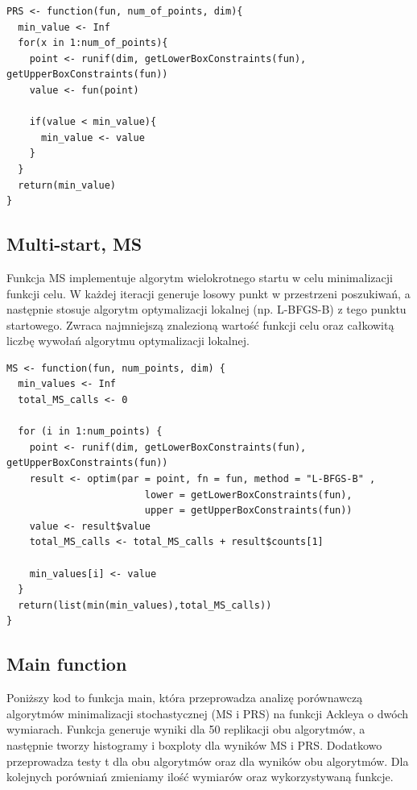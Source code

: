 \documentclass{article}
\begin{document}
\begin{verbatim}
PRS <- function(fun, num_of_points, dim){
  min_value <- Inf
  for(x in 1:num_of_points){
    point <- runif(dim, getLowerBoxConstraints(fun), getUpperBoxConstraints(fun))
    value <- fun(point)

    if(value < min_value){
      min_value <- value
    }
  }
  return(min_value)
}
\end{verbatim}




\subsection{Multi-start, MS}

\hspace{0.5cm} Funkcja MS implementuje algorytm wielokrotnego startu w celu minimalizacji funkcji celu. W każdej iteracji generuje losowy punkt w przestrzeni poszukiwań, a następnie stosuje algorytm optymalizacji lokalnej (np. L-BFGS-B) z tego punktu startowego. Zwraca najmniejszą znalezioną wartość funkcji celu oraz całkowitą liczbę wywołań algorytmu optymalizacji lokalnej.

\begin{verbatim}
MS <- function(fun, num_points, dim) {
  min_values <- Inf
  total_MS_calls <- 0

  for (i in 1:num_points) {
    point <- runif(dim, getLowerBoxConstraints(fun), getUpperBoxConstraints(fun))
    result <- optim(par = point, fn = fun, method = "L-BFGS-B" , 
                        lower = getLowerBoxConstraints(fun), 
                        upper = getUpperBoxConstraints(fun))
    value <- result$value
    total_MS_calls <- total_MS_calls + result$counts[1]  

    min_values[i] <- value
  }
  return(list(min(min_values),total_MS_calls))
}
\end{verbatim}



\subsection{Main function}

\hspace{0.5cm} Poniższy kod to funkcja main, która przeprowadza analizę porównawczą algorytmów minimalizacji stochastycznej (MS i PRS) na funkcji Ackleya o dwóch wymiarach. Funkcja generuje wyniki dla 50 replikacji obu algorytmów, a następnie tworzy histogramy i boxploty dla wyników MS i PRS. Dodatkowo przeprowadza testy t dla obu algorytmów oraz dla wyników obu algorytmów. Dla kolejnych porówniań zmieniamy ilość wymiarów oraz wykorzystywaną funkcje.
\end{document}
